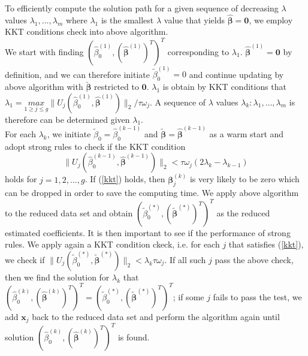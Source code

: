 \documentclass[paper=a4, fontsize=11pt]{scrartcl} %
\begin{document}
To efficiently compute the solution path for a given sequence of decreasing $\lambda$ values ${\lambda_{1},\dots,\lambda_{m}}$ where $\lambda_{1}$ is the smallest $\lambda$ value that yields $\hat{\boldsymbol{\beta}}=\boldsymbol{0}$, we employ KKT conditions check into above algorithm.\\

We start with finding $(\hat{\beta}_{0}^{(1)},(\hat{\boldsymbol{\beta}}^{(1)})^{T})^{T}$ corresponding to $\lambda_{1}$. $\hat{\boldsymbol{\beta}}^{(1)}=\boldsymbol{0}$ by definition, and we can therefore initiate $\tilde{\beta}_{0}^{(1)}=0$ and continue updating by above algorithm with $\breve{\boldsymbol{\beta}}$ restricted to $\boldsymbol{0}$. $\lambda_{1}$ is obtain by KKT conditions that $\lambda_{1}=\underset{1\ge j\le g}{max}{\|U_{j}(\hat{\beta}_{0}^{(1)},\hat{\boldsymbol{\beta}}^{(1)})\|_{2}/\tau\omega_{j}}$. A sequence of $\lambda$ values ${\lambda_{k}:\lambda_{1},\dots,\lambda_{m}}$ is therefore can be determined given $\lambda_{1}$.\\

For each $\lambda_{k}$, we initiate $\tilde{\beta}_{0}=\hat{\beta}_{0}^{(k-1)}$ and $\tilde{\boldsymbol{\beta}}=\hat{\boldsymbol{\beta}}^{(k-1)}$ as a warm start and adopt strong rules to check if the KKT condition
\begin{equation}\label{kkt}
\|U_{j}(\hat{\beta}_{0}^{(k-1)},\hat{\boldsymbol{\beta}}^{(k-1)})\|_{2}<\tau\omega_{j}(2\lambda_{k}-\lambda_{k-1})
\end{equation}
holds for $j=1,2,\dots,g$. If (\ref{kkt}) holds, then $\boldsymbol{\beta}_{j}^{(k)}$ is very likely to be zero which can be dropped in order to save the computing time. We apply above algorithm to the reduced data set and obtain $(\tilde{\beta}_{0}^{(*)},(\tilde{\boldsymbol{\beta}}^{(*)})^{T})^{T}$ as the reduced estimated coefficients. It is then important to see if the performance of strong rules. We apply again a KKT condition ckeck, i.e. for each $j$ that satisfies (\ref{kkt}), we check if $\|U_{j}(\tilde{\beta}_{0}^{(*)},\tilde{\boldsymbol{\beta}}^{(*)})\|_{2}<\lambda_{k}\tau\omega_{j}$. If all such $j$ pass the above check, then we find the solution for $\lambda_{k}$ that $(\hat{\beta}_{0}^{(k)},(\hat{\boldsymbol{\beta}}^{(k)})^{T})^{T}=(\tilde{\beta}_{0}^{(*)},(\tilde{\boldsymbol{\beta}}^{(*)})^{T})^{T}$; if some $j$ fails to pass the test, we add $\boldsymbol{x}_{j}$ back to the reduced data set and perform the algorithm again until solution $(\hat{\beta}_{0}^{(k)},(\hat{\boldsymbol{\beta}}^{(k)})^{T})^{T}$ is found.
\end{document}
